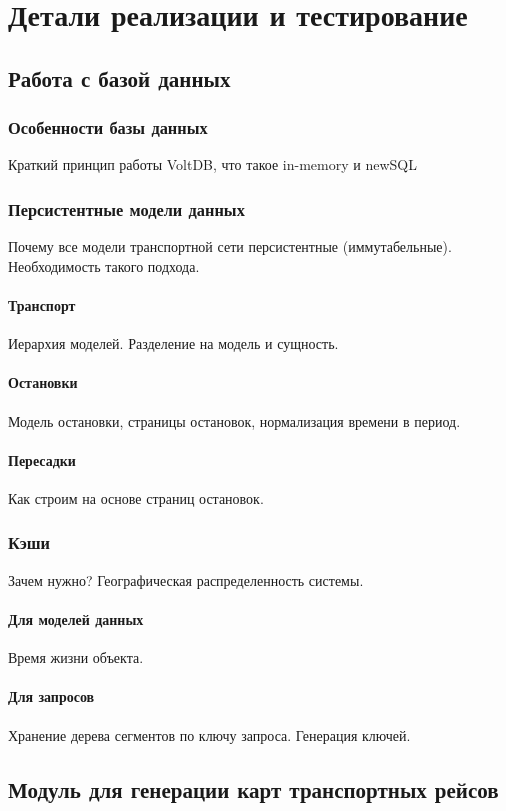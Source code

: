 \chapter{Детали реализации и тестирование}

\section{Работа с базой данных}
\subsection{Особенности базы данных}
Краткий принцип работы VoltDB, что такое in-memory и newSQL
\subsection{Персистентные модели данных}
Почему все модели транспортной сети персистентные (иммутабельные). Необходимость такого подхода.
\subsubsection{Транспорт}
Иерархия моделей. Разделение на модель и сущность.
\subsubsection{Остановки}
Модель остановки, страницы остановок, нормализация времени в период.
\subsubsection{Пересадки}
Как строим на основе страниц остановок.
\subsection{Кэши}
Зачем нужно? Географическая распределенность системы.
\subsubsection{Для моделей данных}
Время жизни объекта.
\subsubsection{Для запросов}
Хранение дерева сегментов по ключу запроса. Генерация ключей.
\section{Модуль для генерации карт транспортных рейсов}
